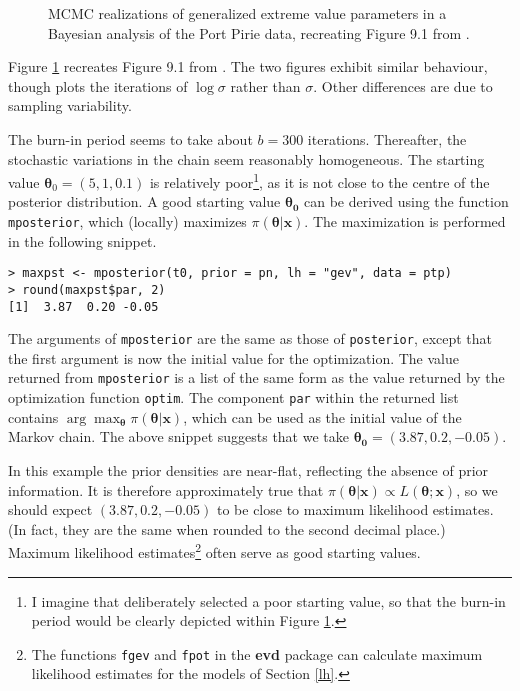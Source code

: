 \documentclass[11pt,a4paper]{article}
\newcommand{\bs}{\boldsymbol}
\begin{document}
\begin{figure}
\begin{center}
   \vspace{-1.5cm}
  \hspace{0cm} 
  \hspace{0cm} 
\end{center}
\caption{MCMC realizations of generalized extreme value parameters in
  a Bayesian analysis of the Port Pirie data, recreating Figure 9.1
  from \citet{cole01}.}
\label{pirietrace1}
\end{figure}

Figure \ref{pirietrace1} recreates Figure 9.1 from \citet{cole01}.
The two figures exhibit similar behaviour, though \citet{cole01} plots
the iterations of $\log \sigma$ rather than $\sigma$.  Other
differences are due to sampling variability.

The burn-in period seems to take about $b=300$ iterations.
Thereafter, the stochastic variations in the chain seem reasonably
homogeneous.  The starting value $\bs{\theta}_0 = (5,1,0.1)$ is
relatively poor\footnote{I imagine that \citet{cole01} deliberately
  selected a poor starting value, so that the burn-in period would be
  clearly depicted within Figure \ref{pirietrace1}.}, as it is not
close to the centre of the posterior distribution.  A good starting
value $\bs{\theta_0}$ can be derived using the function
\verb+mposterior+, which (locally) maximizes
$\pi(\bs{\theta}|\bs{x})$.  The maximization is performed in the
following snippet.

\begin{verbatim}
> maxpst <- mposterior(t0, prior = pn, lh = "gev", data = ptp)
> round(maxpst$par, 2)
[1]  3.87  0.20 -0.05
\end{verbatim}

The arguments of \verb+mposterior+ are the same as those of
\verb+posterior+, except that the first argument is now the initial
value for the optimization.  The value returned from \verb+mposterior+
is a list of the same form as the value returned by the optimization
function \verb+optim+.  The component \verb+par+ within the returned
list contains $\arg\max_{\bs{\theta}} \pi(\bs{\theta}|\bs{x})$, which
can be used as the initial value of the Markov chain.  The above
snippet suggests that we take $\bs{\theta_0} = (3.87,0.2,-0.05)$.

In this example the prior densities are near-flat, reflecting the
absence of prior information.  It is therefore approximately true that
$\pi(\bs{\theta}|\bs{x}) \propto L(\bs{\theta};\bs{x})$, so we should
expect $(3.87,0.2,-0.05)$ to be close to maximum likelihood estimates.
(In fact, they are the same when rounded to the second decimal place.)
Maximum likelihood estimates\footnote{The functions \texttt{fgev} and
  \texttt{fpot} in the \textbf{evd} package can calculate maximum
  likelihood estimates for the models of Section \ref{lh}.} often
serve as good starting values.
\end{document}
